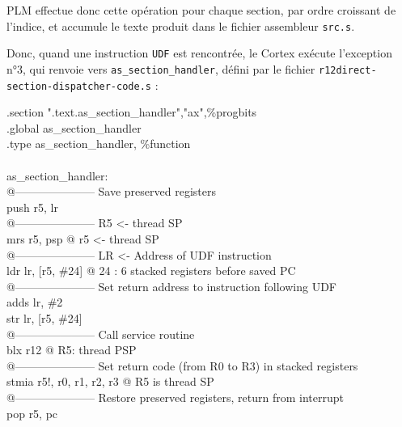 PLM effectue donc cette opération pour chaque section, par ordre croissant de l'indice, et accumule le texte produit dans le fichier assembleur \texttt{src.s}.

Donc, quand une instruction \texttt{UDF} est rencontrée, le Cortex exécute l'exception n°3, qui renvoie vers \texttt{as\_section\_handler}, défini par le fichier \texttt{r12direct-section-dispatcher-code.s} :

\begin{SHELL}\small
\hspace*{1.2em}.section	".text.as\_section\_handler","ax",\%progbits\\
\hspace*{1.2em}.global as\_section\_handler\\
\hspace*{1.2em}.type as\_section\_handler, \%function\\
\\
as\_section\_handler:\\
@--------------------- Save preserved registers\\
\hspace*{1.2em}push  {r5, lr}\\
@--------------------- R5 <- thread SP\\
\hspace*{1.2em}mrs   r5, psp           @ r5 <- thread SP\\
@--------------------- LR <- Address of UDF instruction\\
\hspace*{1.2em}ldr   lr, [r5, \#24]     @ 24 : 6 stacked registers before saved PC\\
@--------------------- Set return address to instruction following UDF\\
\hspace*{1.2em}adds  lr, \#2\\
\hspace*{1.2em}str   lr, [r5, \#24]\\
@--------------------- Call service routine\\
\hspace*{1.2em}blx   r12                      @ R5: thread PSP\\
@--------------------- Set return code (from R0 to R3) in stacked registers\\
\hspace*{1.2em}stmia r5!, {r0, r1, r2, r3}    @ R5 is thread SP\\
@--------------------- Restore preserved registers, return from interrupt\\
\hspace*{1.2em}pop   {r5, pc}
\end{SHELL}

